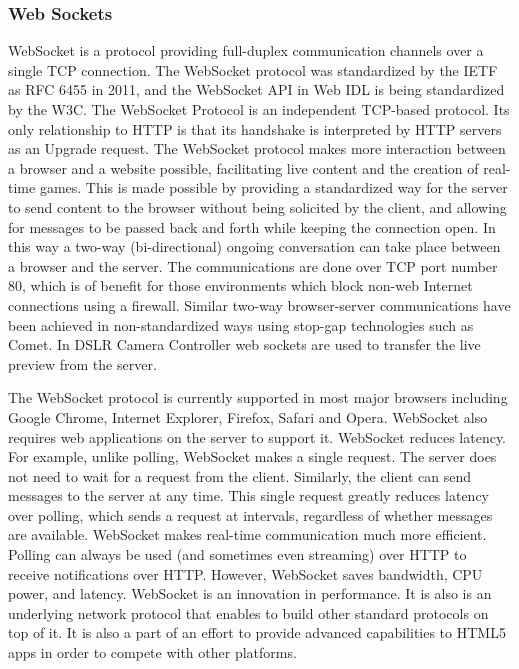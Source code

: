 \subsubsection{Web Sockets}
WebSocket is a protocol providing full-duplex communication channels over a single TCP connection. The WebSocket protocol was standardized by the IETF as RFC 6455 in 2011, and the WebSocket API in Web IDL is being standardized by the W3C. The WebSocket Protocol is an independent TCP-based protocol. Its only relationship to HTTP is that its handshake is interpreted by HTTP servers as an Upgrade request. The WebSocket protocol makes more interaction between a browser and a website possible, facilitating live content and the creation of real-time games. This is made possible by providing a standardized way for the server to send content to the browser without being solicited by the client, and allowing for messages to be passed back and forth while keeping the connection open. In this way a two-way (bi-directional) ongoing conversation can take place between a browser and the server. The communications are done over TCP port number 80, which is of benefit for those environments which block non-web Internet connections using a firewall. Similar two-way browser-server communications have been achieved in non-standardized ways using stop-gap technologies such as Comet. In DSLR Camera Controller web sockets are used to transfer the live preview from the server.

The WebSocket protocol is currently supported in most major browsers including Google Chrome, Internet Explorer, Firefox, Safari and Opera. WebSocket also requires web applications on the server to support it. WebSocket reduces latency. For example, unlike polling, WebSocket makes a single request. The server does not need to wait for a request from the client. Similarly, the client can send messages to the server at any time. This single request greatly reduces latency over polling, which sends a request at intervals, regardless of whether messages are available. WebSocket makes real-time communication much more efficient. Polling can always be used (and sometimes even streaming) over HTTP to receive notifications over HTTP. However, WebSocket saves bandwidth, CPU power, and latency. WebSocket is an innovation in performance. It is also is an underlying network protocol that enables to build other standard protocols on top of it. It is also a part of an effort to provide advanced capabilities to HTML5 apps in order to compete with other platforms.
